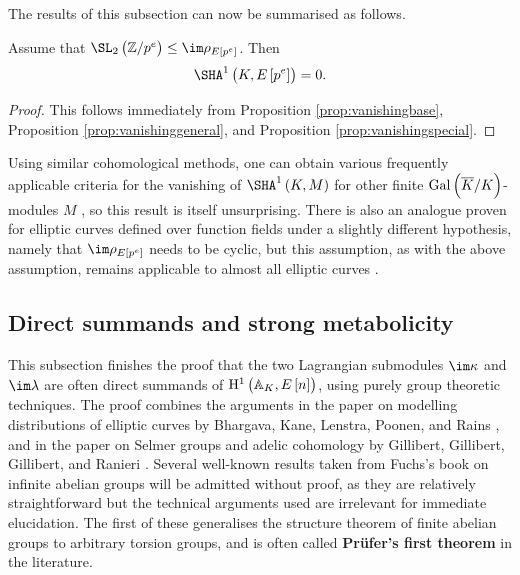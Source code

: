 The results of this subsection can now be summarised as follows.

\begin{corollary}
\label{cor:vanishingsummary}
Assume that $ \SL_2\br{\ZZ / p^e} \le \im \rho_{E\sbr{p^e}} $. Then
$$ \Sha[K, E\sbr{p^e}] = 0. $$
\end{corollary}

\begin{proof}
This follows immediately from Proposition \ref{prop:vanishingbase}, Proposition \ref{prop:vanishinggeneral}, and Proposition \ref{prop:vanishingspecial}.
\end{proof}

\begin{remark}
Using similar cohomological methods, one can obtain various frequently applicable criteria for the vanishing of $ \Sha[K, M] $ for other finite $ \AG{K} $-modules $ M $ \cite[Proposition 3.3]{PR12}, so this result is itself unsurprising. There is also an analogue proven for elliptic curves defined over function fields under a slightly different hypothesis, namely that $ \im \rho_{E\sbr{p^e}} $ needs to be cyclic, but this assumption, as with the above assumption, remains applicable to almost all elliptic curves \cite[Proposition 6.1]{BKLPR15}.
\end{remark}

\pagebreak

\subsection{Direct summands and strong metabolicity}

This subsection finishes the proof that the two Lagrangian submodules $ \im \kappa $ and $ \im \lambda $ are often direct summands of $ \HE[n]{\AA_K} $, using purely group theoretic techniques. The proof combines the arguments in the paper on modelling distributions of elliptic curves by Bhargava, Kane, Lenstra, Poonen, and Rains \cite{BKLPR15}, and in the paper on Selmer groups and adelic cohomology by Gillibert, Gillibert, Gillibert, and Ranieri \cite{GGGR19}. Several well-known results taken from Fuchs's book on infinite abelian groups \cite{Fuc70} will be admitted without proof, as they are relatively straightforward but the technical arguments used are irrelevant for immediate elucidation. The first of these generalises the structure theorem of finite abelian groups to arbitrary torsion groups, and is often called \textbf{Pr\"ufer's first theorem} in the literature.

